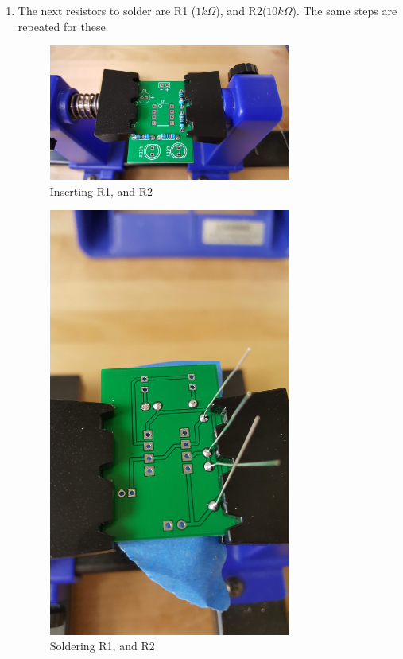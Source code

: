 \documentclass{article}
\begin{document}
\begin{enumerate}
      \item   The next resistors to solder are R1 ($1k\Omega$), and R2($10k\Omega$). The same steps are repeated for these.
      
\begin{figure}[H]
\caption{ Inserting R1, and R2 }
\label{fig:img/0021.jpg}
\centering
\includegraphics[width=0.75\textwidth]{img/0021.jpg}
\end{figure}

      
\begin{figure}[H]
\caption{ Soldering R1, and R2 }
\label{fig:img/0022.jpg}
\centering
\includegraphics[width=0.75\textwidth]{img/0022.jpg}
\end{figure}


\end{enumerate}
\end{document}
